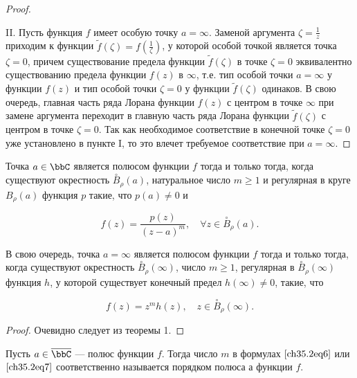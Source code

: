 \begin{proof}
\begin{enumerate}
\end{enumerate}

II. Пусть функция $f$ имеет особую точку $a = \infty$. Заменой аргумента $\zeta = \frac{1}{z}$ приходим к функции $\widetilde{f}(\zeta) = f(\frac{1}{\zeta})$, у которой особой точкой является точка $\zeta = 0$, причем существование предела функции $\widetilde{f}(\zeta)$ в точке $\zeta = 0$ эквивалентно существованию предела функции $f(z)$ в $\infty$, т.е. тип особой точки $a = \infty$ у функции $f(z)$ и тип особой точки $\zeta = 0$ у функции $\widetilde{f}(\zeta)$ одинаков. В свою очередь, главная часть ряда Лорана функции $f(z)$ с центром в точке $\infty$ при замене аргумента переходит в главную часть ряда Лорана функции $\widetilde{f}(\zeta)$ с центром в точке $\zeta = 0$. Так как необходимое соответствие в конечной точке $\zeta = 0$ уже установлено в пункте I, то это влечет требуемое соответствие при $a  =\infty$.

\end{proof}

\begin{cons} \label{ch35.2cons1}
Точка $a \in \bbC$ является полюсом функции $f$ тогда и только тогда, когда существуют окрестность $\overset{\circ}{B}_\rho(a)$, натуральное число $m \ge 1$ и регулярная в круге $B_\rho(a)$ функция $p$ такие, что $p(a) \not = 0$ и

\begin{equation} \label{ch35.2eq6}
f(z) = \frac{p(z)}{(z - a)^m}, \quad \forall z \in \overset{\circ}{B}_\rho(a).
\end{equation}

В свою очередь, точка $a = \infty$ является полюсом функции $f$ тогда и только тогда, когда существуют окрестность $\overset{\circ}{B}_\rho(\infty)$, число $m \ge 1$, регулярная в $\overset{\circ}{B}_\rho(\infty)$ функция $h$, у которой существует конечный предел $h(\infty) \not= 0$, такие, что

\begin{equation} \label{ch35.2eq7}
f(z) = z^m h(z), \quad z \in \overset{\circ}{B}_\rho(\infty).
\end{equation}

\end{cons}

\begin{proof}
Очевидно следует из теоремы 1.
\end{proof}

\begin{defn}
Пусть $a \in \overline{\bbC}$ --- полюс функции $f$. Тогда число $m$ в формулах $\eqref{ch35.2eq6}$ или $\eqref{ch35.2eq7}$ соответственно называется порядком полюса а функции $f$.
\end{defn}

